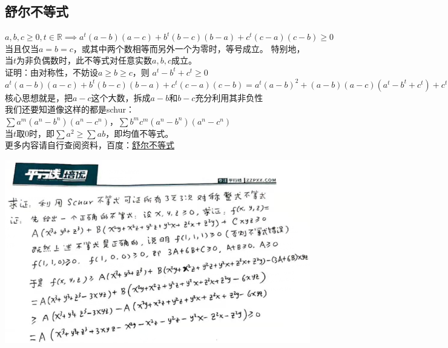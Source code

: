 \documentclass[UTF8]{ctexart}
\begin{document}
\subsection{舒尔不等式}
$ a,b,c \geq 0,t\in \mathbb{R}\implies a^{t}(a-b)(a-c)+b^{t}(b-c)(b-a)+c^{t}(c-a)(c-b)\geq 0$\\当且仅当$ a=b=c $，或其中两个数相等而另外一个为零时，等号成立。
特别地，当$ t $为非负偶数时，此不等式对任意实数$ a,b,c $成立。\\
证明：由对称性，不妨设$ a\geq b\geq c$，则 $a^{t}-b^{t}+c^{t}\geq 0 $\\
$ a^{t}(a-b)(a-c)+b^{t}(b-c)(b-a)+c^{t}(c-a)(c-b)=a^{t}(a-b)^{2}+(a-b)(a-c)(a^{t}-b^{t}+c^{t})+c^{t}(b-c)^{2}\geq 0 $\\
核心思想就是，把$ a-c $这个大数，拆成$ a-b $和$ b-c $充分利用其非负性\\
我们还要知道像这样的都是schur：\\
$\displaystyle  \sum  a^{m}\left(a^{n}-b^{n}\right)\left(a^{n}-c^{n}\right)$，$\displaystyle \sum b^{m} c^{m}\left(a^{n}-b^{n}\right)\left(a^{n}-c^{n}\right)$\\
当$ t $取$ 0 $时，即$ \displaystyle  \sum a^{2}\geq \displaystyle  \sum ab$，即均值不等式。\\
更多内容请自行查阅资料，百度：\href{https://baike.baidu.com/item/%E8%88%92%E5%B0%94%E4%B8%8D%E7%AD%89%E5%BC%8F/4224241?fr=aladdin}{舒尔不等式}
\begin{center}
	\includegraphics[width=0.8\linewidth]{36}
\end{center}
\end{document}
